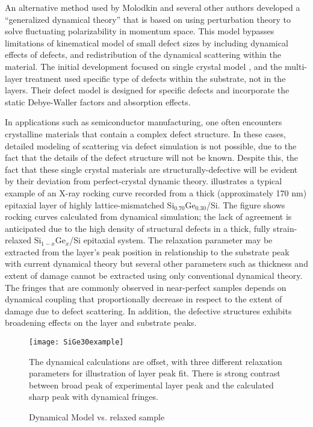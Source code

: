 An alternative method used by Molodkin and several other authors \cite{Molodkin,Molodkin1,Molodkin2,Molodkin3,Molodkin2008} developed a ``generalized dynamical theory'' that is based on using perturbation theory to solve fluctuating polarizability in momentum space.  This model bypasses limitations of kinematical model of small defect sizes by including dynamical effects of defects, and redistribution of the dynamical scattering within the material.  The initial development focused on single crystal model \cite{Molodkin,Molodkin2,Molodkin3}, and the multi-layer treatment \cite{Molodkin1} used specific type of defects within the substrate, not in the layers.  Their defect model is designed for specific defects and incorporate the static Debye-Waller factors and absorption effects.


In applications such as semiconductor manufacturing, one often encounters crystalline materials that contain a complex defect structure. In these cases, detailed modeling of scattering via defect simulation is not possible, due to the fact that the details of the defect structure will not be known. Despite this, the fact that these single crystal materials are structurally-defective will be evident by their deviation from perfect-crystal dynamic theory.   illustrates a typical example of an X-ray rocking curve recorded from a thick (approximately 170 nm) epitaxial layer of highly lattice-mismatched Si$_{0.70}$Ge$_{0.30}$/Si. The figure shows rocking curves calculated from dynamical simulation; the lack of agreement is anticipated due to the high density of structural defects in a thick, fully strain-relaxed Si$_{1-x}$Ge$_{x}$/Si epitaxial system. The relaxation parameter may be extracted from the layer's peak position in relationship to the substrate peak with current dynamical theory but several other parameters such as thickness and extent of damage cannot be extracted using only conventional dynamical theory.  The fringes that are commonly observed in near-perfect samples depends on dynamical coupling that proportionally decrease in respect to the extent of damage due to defect scattering.  In addition, the defective structures exhibits broadening effects on the layer and substrate peaks.  

\begin{figure}[h]
\caption{Dynamical Model vs. relaxed sample}
\label{30example}
\begin{minipage}{\linewidth}
\texttt{[image: SiGe30example]}
\end{minipage}
The dynamical calculations are offset, with three different relaxation parameters for illustration of layer peak fit.  There is strong contrast between broad peak of experimental layer peak and the calculated sharp peak with dynamical fringes.
\end{figure}

